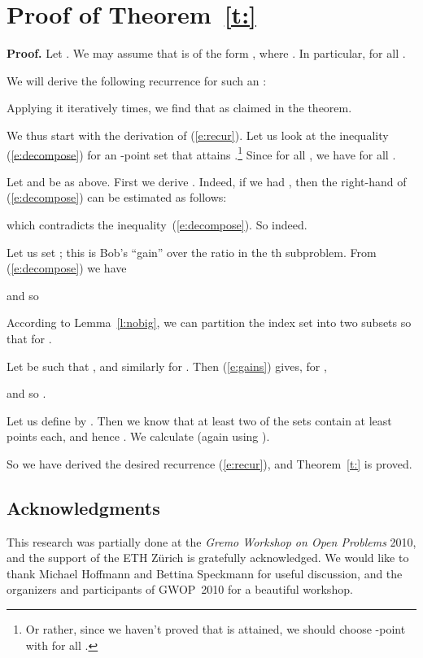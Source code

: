 \documentclass[11pt]{article}
\newcommand{\qed}{\hspace{\stretch{1}}}
\newenvironment{proof}{\vspace{-.25\baselineskip}\noindent\textbf{Proof.}
}{\qed\par\medskip}
\begin{document}
\section{Proof of Theorem~\ref{t:}}
\begin{proof}Let .
We may assume that  is of the form ,
where . In particular,  for all .

We will derive the following recurrence for such an :

Applying it iteratively  times, we find that
 as claimed in the theorem.

We thus start with the derivation of (\ref{e:recur}).
Let us look at the inequality (\ref{e:decompose}) for an -point set 
that attains .\footnote{Or rather,
since we haven't proved that 
is attained, we should choose -point 
with   for all .}
Since  for all , we have
 for all . 

Let  and  be as above.
First we derive .
Indeed, if we had , then the right-hand of 
(\ref{e:decompose}) can be estimated as follows:

which contradicts the inequality~(\ref{e:decompose}).
So  indeed.



Let us set ; this is Bob's ``gain'' over the ratio 
in the th subproblem. From (\ref{e:decompose}) we have

and so


According to Lemma~\ref{l:nobig}, we can partition the index set
 into two subsets  so that
 for . 


Let  be such that , and
similarly for . Then (\ref{e:gains}) gives, for ,

and so .

Let us define  by .
Then we know that at least two of the sets  contain at least
 points each, and hence .
We calculate  (again using ).

So we have derived the desired recurrence (\ref{e:recur}),
and Theorem~\ref{t:} is proved.
\end{proof}
\subsection*{Acknowledgments}
This research was partially done at the \emph{Gremo Workshop on Open Problems} 2010,
and the support of the ETH Z\"urich is gratefully acknowledged.
We would like to thank Michael Hoffmann and Bettina Speckmann
for useful discussion, and the organizers and participants of GWOP~2010 for a beautiful workshop.
\end{document}
